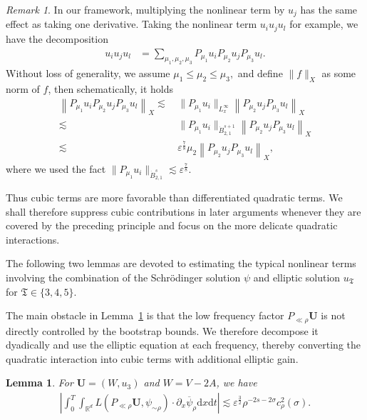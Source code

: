 \documentclass[11pt,letterpaper,reqno]{amsart}
\numberwithin{equation}{section}
\newtheorem{lemma}[theorem]{Lemma}
\theoremstyle{definition}
\theoremstyle{remark}
\newtheorem{remark}[theorem]{Remark}
\begin{document}
\begin{remark}  \label{Rem_J11t4}
	In our framework, multiplying the nonlinear term by $ u_j $ has the same effect as taking one derivative. Taking the nonlinear term $u_i u_j u_l$ for example, we have the decomposition
	\begin{align*}
		u_i u_j u_l&= \sum_{\mu_1, \mu_2, \mu_3} P_{\mu_1} u_i P_{\mu_2} u_j P_{\mu_3} u_l.
	\end{align*}
Without loss of generality, we assume $ \mu_1\leq \mu_2 \leq \mu_3, $ and define $\|f\|_{X}$ as some norm of $f$, then schematically, it holds
	\begin{align*}
		\left\| P_{\mu_1} u_i P_{\mu_2} u_j P_{\mu_3} u_l\right\|_{X} \lesssim &\,\| P_{\mu_1} u_i  \|_{L^\infty_x} \left\|P_{\mu_2} u_j P_{\mu_3} u_l\right\|_{X}  \\
		\lesssim  &\,\| P_{\mu_1} u_i  \|_{\dot{B}^{s+1}_{2,1}} 	\left\|P_{\mu_2} u_j P_{\mu_3} u_l\right\|_{X}\\
		\lesssim  &\,\varepsilon^{\frac 78}\mu_2 \left\|P_{\mu_2} u_j P_{\mu_3} u_l\right\|_{X},
	\end{align*}
where we used the fact $ \| P_{\mu_1} u_i  \|_{\dot{B}^{s}_{2,1}} 	\lesssim  \varepsilon^{\frac 78}.$

Thus cubic terms are more favorable than differentiated quadratic terms.  We shall therefore suppress cubic
contributions in later arguments whenever they are covered by the preceding
principle and focus on the more delicate quadratic interactions.


\end{remark}

The following two lemmas are devoted to estimating the typical nonlinear terms involving the combination of the Schr\"odinger solution $ \psi $ and elliptic solution $ u_{\mathfrak{T}}$ for  $\mathfrak{T}\in\{3,4,5\}.  $

The main obstacle in Lemma~\ref{lem_J1} is that the low frequency factor
\(P_{\ll\rho}\mathbf{U}\) is not directly controlled by the bootstrap bounds.
We therefore decompose it dyadically and use the elliptic equation at each
frequency, thereby converting the quadratic interaction into cubic terms with
additional elliptic gain.
\begin{lemma} \label{lem_J1}
For  $ \mathbf{U}=(W, u_3) $ and \(W=V-2A\),  we have
	\begin{align}
	 \left|\int_0^T \int_{\mathbb{R}^{d}} L( P_{\ll \rho } \mathbf{U},   \psi_{\sim \rho }) \cdot\partial_x  \overline{\psi}_{\rho} \mathrm{ d} x\mathrm{ d} t\right|
 \lesssim \varepsilon^{\frac32}\rho ^{-2s-2\sigma}c^2_\rho(\sigma).  \label{est_J1}
	\end{align}
\end{lemma}
\end{document}
